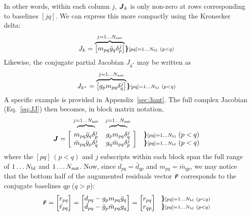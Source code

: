 \documentclass[useAMS,usenatbib]{mn2e}
\makeatletter
\newcommand{\mat}[1]{{\bmath{#1}}}
\newcommand{\JJ}{\mat{J}} %
\newcommand{\Matrix}[2]{\left [ \begin{array}{@{}#1@{}}#2\end{array} \right ]}
\newcommand{\Stack}[1]{\begin{array}{@{}c@{}}#1\end{array}}
\newcommand{\AUG}[1]{\bmath{\breve{#1}}}
\newcommand{\Rr}{\AUG{r}}
\numberwithin{equation}{section}
\makeatother
\begin{document}
In other words, within each column $j$, $\JJ_k$ is only non-zero at rows corresponding to baselines $[jq]$. We can express 
this more compactly using the Kronecker delta:
\begin{equation}
\label{eq:Jk}
J_k = \overbrace{ \Matrix{c}{ m_{pq}\bar{g}_q\delta^{j}_p } } ^{j=1\dots \Na} %
\bm{ \}} {\scriptstyle [pq]=1\dots \Nbl~(p<q)}
\end{equation}
Likewise, the conjugate partial Jacobian $J_{k^*}$ may be written as
\begin{equation}
\label{eq:Jbark}
J_{k^*} = \overbrace{ \Matrix{c}{ g_p m_{pq} \delta^{j}_q } } ^{j=1\dots \Na} %
\bm{ \}} {\scriptstyle [pq]=1\dots \Nbl~(p<q)}
\end{equation}
A specific example is provided in Appendix~\ref{sec:3ant}. The full complex Jacobian (Eq.~\ref{eq:JJ}) then 
becomes, in block matrix notation,
\begin{equation}
\label{eq:JJ:di:basic}
\begin{array}{r@{~}cc@{~}cc}
                & \overbrace{~~~~~~~~}^{j=1\dots \Na} & \overbrace{~~~~~~~~}^{j=1\dots \Na} \\
\JJ = \bigg [ &
  \Stack{ m_{pq}\bar{g}_q\delta^{j}_p \\ \bar{m}_{pq} \bar{g}_p \delta^{j}_q } &
  \Stack{ g_p m_{pq} \delta^{j}_q \\ g_q \bar{m}_{pq} \delta^{j}_p }  
& \bigg ] &
\Stack{ \bm{\}} {\scriptstyle [pq]=1\dots \Nbl}~(p<q) \\ %
\bm{\}} {\scriptstyle [pq]=1\dots \Nbl}~(p<q) }
\end{array}
\end{equation}
where the $[pq]~(p<q)$ and $j$ subscripts within each block span the full range of $1\dots N_\mathrm{bl}$ and 
$1\dots N_\mathrm{ant}$. Now, since $d_{pq} = \bar{d}_{qp}$ and $m_{pq} = \bar{m}_{qp}$, we may notice
that the bottom half of the augumented residuals vector $\Rr$ corresponds to the conjugate baselines 
$qp$ ($q>p$):
\begin{equation}
\Rr = \Matrix{c}{ r_{pq} \\ \bar{r}_{pq} } = \Matrix{c}{d_{pq}-g_p m_{pq}\bar{g}_q\\ \bar{d}_{pq}-\bar{g}_p \bar{m}_{pq}g_q} = 
\Matrix{c}{ r_{pq} \\ r_{qp} }~~ 
\Stack{ \bm{\}} \scriptstyle [pq]=1\dots \Nbl~(p<q) \\ %
\bm{\}} \scriptstyle [pq]=1\dots \Nbl~(p<q) }
\end{equation}
\end{document}
